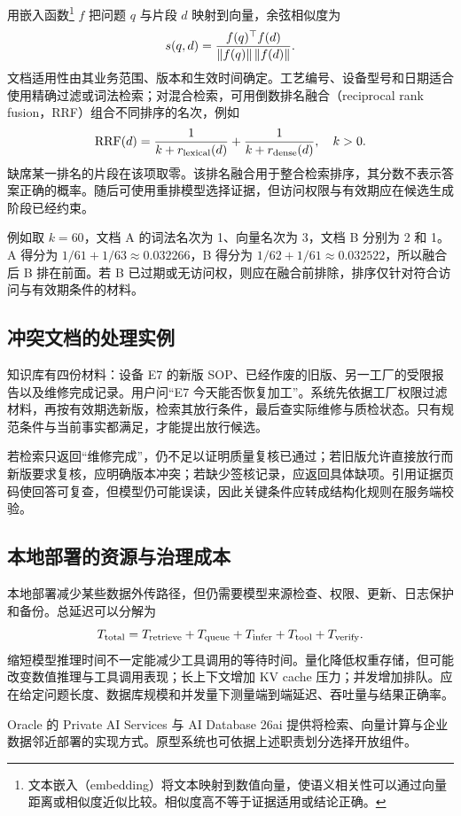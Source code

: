 用嵌入函数\footnote{文本嵌入（embedding）将文本映射到数值向量，使语义相关性可以通过向量距离或相似度近似比较。相似度高不等于证据适用或结论正确。} \(f\) 把问题 \(q\) 与片段 \(d\) 映射到向量，余弦相似度为
\[
s(q,d)=\frac{f(q)^\top f(d)}{\left\lVert f(q)\right\rVert\left\lVert f(d)\right\rVert}.
\]
文档适用性由其业务范围、版本和生效时间确定。工艺编号、设备型号和日期适合使用精确过滤或词法检索；对混合检索，可用倒数排名融合（reciprocal rank fusion，RRF）组合不同排序的名次，例如
\[
\operatorname{RRF}(d)=
\frac1{k+r_{\rm lexical}(d)}
+\frac1{k+r_{\rm dense}(d)},\quad k>0.
\]
缺席某一排名的片段在该项取零。该排名融合用于整合检索排序，其分数不表示答案正确的概率。随后可使用重排模型选择证据，但访问权限与有效期应在候选生成阶段已经约束。

例如取 \(k=60\)，文档 A 的词法名次为 1、向量名次为 3，文档 B 分别为 2 和 1。A 得分为 \(1/61+1/63\approx0.032266\)，B 得分为 \(1/62+1/61\approx0.032522\)，所以融合后 B 排在前面。若 B 已过期或无访问权，则应在融合前排除，排序仅针对符合访问与有效期条件的材料。

\subsection{冲突文档的处理实例}
知识库有四份材料：设备 E7 的新版 SOP、已经作废的旧版、另一工厂的受限报告以及维修完成记录。用户问“E7 今天能否恢复加工”。系统先依据工厂权限过滤材料，再按有效期选新版，检索其放行条件，最后查实际维修与质检状态。只有规范条件与当前事实都满足，才能提出放行候选。

若检索只返回“维修完成”，仍不足以证明质量复核已通过；若旧版允许直接放行而新版要求复核，应明确版本冲突；若缺少签核记录，应返回具体缺项。引用证据页码使回答可复查，但模型仍可能误读，因此关键条件应转成结构化规则在服务端校验。

\subsection{本地部署的资源与治理成本}
本地部署减少某些数据外传路径，但仍需要模型来源检查、权限、更新、日志保护和备份。总延迟可以分解为
\[
T_{\rm total}=T_{\rm retrieve}+T_{\rm queue}
+T_{\rm infer}+T_{\rm tool}+T_{\rm verify}.
\]
缩短模型推理时间不一定能减少工具调用的等待时间。量化降低权重存储，但可能改变数值推理与工具调用表现；长上下文增加 KV cache 压力；并发增加排队。应在给定问题长度、数据库规模和并发量下测量端到端延迟、吞吐量与结果正确率。

Oracle 的 Private AI Services 与 AI Database 26ai 提供将检索、向量计算与企业数据邻近部署的实现方式\cite{oracle10}。原型系统也可依据上述职责划分选择开放组件。

